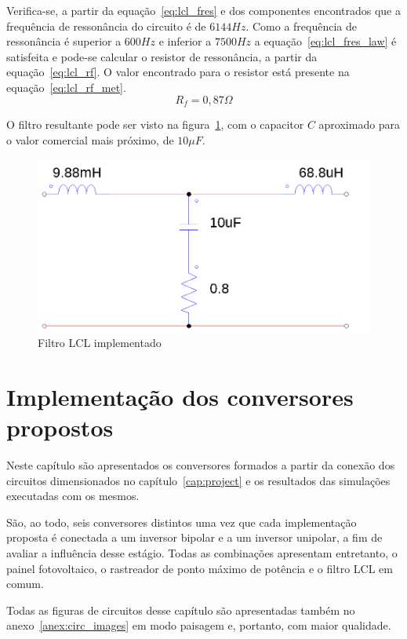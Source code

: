 \documentclass[
	12pt,				%
	openright,			%
	twoside,			%
	a4paper,			%
	english,			%
	french,				%
	spanish,			%
	brazil,				%
	]{abntex2}
\begin{document}
Verifica-se, a partir da equação~\ref{eq:lcl_fres} e dos componentes encontrados que a frequência de ressonância do circuito é de $6144Hz$. Como a frequência de ressonância é superior a $600Hz$ e inferior a $7500Hz$ a equação~\ref{eq:lcl_fres_law} é satisfeita e pode-se calcular o resistor de ressonância, a partir da equação~\ref{eq:lcl_rf}. O valor encontrado para o resistor está presente na equação~\ref{eq:lcl_rf_met}.
\begin{equation}%
	R_f = 0,87 \Omega \label{eq:lcl_rf_met}
\end{equation}

O filtro resultante pode ser visto na figura~\ref{fig:lcl_filter_impl}, com o capacitor $C$ aproximado para o valor comercial mais próximo, de $10 \mu F$.

\begin{figure}[H]%
	\begin{center}%
		\includegraphics[width=0.65 \linewidth]{lcl_filter_psim}
		\caption{Filtro LCL implementado}
		\label{fig:lcl_filter_impl}
	\end{center}
\end{figure}

\chapter{Implementação dos conversores propostos}

Neste capítulo são apresentados os conversores formados a partir da conexão dos circuitos dimensionados no capítulo~\ref{cap:project} e os resultados das simulações executadas com os mesmos.

São, ao todo, seis conversores distintos uma vez que cada implementação proposta é conectada a um inversor bipolar e a um inversor unipolar, a fim de avaliar a influência desse estágio. Todas as combinações apresentam entretanto, o painel fotovoltaico, o rastreador de ponto máximo de potência e o filtro LCL em comum.

Todas as figuras de circuitos desse capítulo são apresentadas também no anexo~\ref{anex:circ_images} em modo paisagem e, portanto, com maior qualidade.
\end{document}
